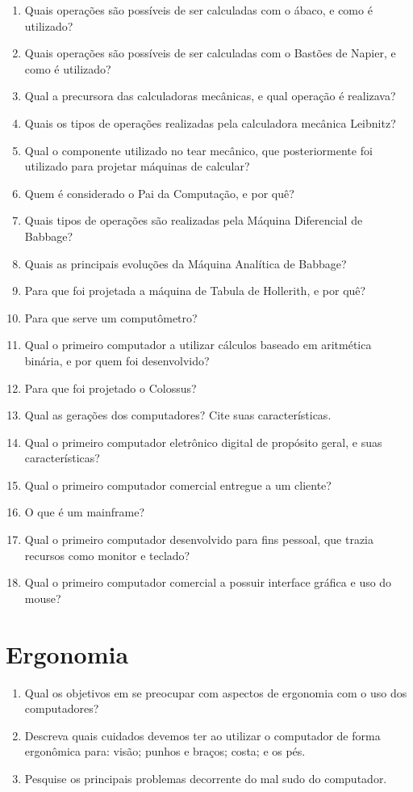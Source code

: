 \documentclass[11pt]{article}
\begin{document}
	\begin{enumerate}
		\item Quais opera\c cões são possíveis de ser calculadas com o ábaco, e como é utilizado?
		\item Quais opera\c cões são possíveis de ser calculadas com o Bastões de Napier, e como é utilizado?
		\item Qual a precursora das calculadoras mecânicas, e qual opera\c cão é realizava?
		\item Quais os tipos de operações realizadas pela calculadora mecânica Leibnitz?
		\item Qual o componente utilizado no tear mecânico, que posteriormente foi utilizado para projetar máquinas de calcular?
		\item Quem é considerado o Pai da Computa\c cão, e por quê?
		\item Quais tipos de operações são realizadas pela Máquina Diferencial de Babbage?
		\item Quais as principais evoluções da Máquina Analítica de Babbage?
		\item Para que foi projetada a máquina de Tabula de Hollerith, e por quê?
		\item Para que serve um computômetro?
		\item Qual o primeiro computador a utilizar cálculos baseado em aritmética binária, e por quem foi desenvolvido?
		\item Para que foi projetado o Colossus?
		\item Qual as gera\c cões dos computadores? Cite suas características.
		\item Qual o primeiro computador eletrônico digital de propósito geral, e suas características?
		\item Qual o primeiro computador comercial entregue a um cliente?
		\item O que é um mainframe?
		\item Qual o primeiro computador desenvolvido para fins pessoal, que trazia recursos como monitor e teclado?
		\item Qual o primeiro computador comercial a possuir interface gráfica e uso do mouse?
	\end{enumerate}
	
	\newpage
	\section{Ergonomia}
	\begin{enumerate}
		\item Qual os objetivos em se preocupar com aspectos de ergonomia com o uso dos computadores?
		\item Descreva quais cuidados devemos ter ao utilizar o computador de forma ergonômica para: visão; punhos e bra\c cos; costa; e os pés.
		\item Pesquise os principais problemas decorrente do mal sudo do computador.
	\end{enumerate}
	
\end{document}

